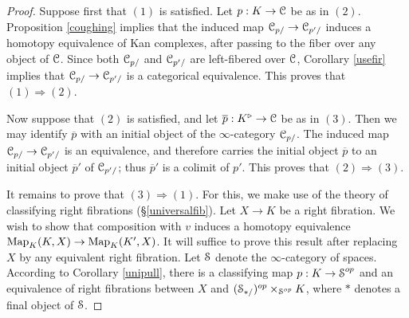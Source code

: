 \begin{proof}
Suppose first that $(1)$ is satisfied. Let $p: K \rightarrow \operatorname{\mathcal{C}}$ be as in $(2)$. Proposition \ref{coughing} implies that the induced map $\operatorname{\mathcal{C}}_{p/} \rightarrow \operatorname{\mathcal{C}}_{p'/}$ induces a homotopy equivalence of Kan complexes, after passing to the fiber over any object of $\operatorname{\mathcal{C}}$. Since
both $\operatorname{\mathcal{C}}_{p/}$ and $\operatorname{\mathcal{C}}_{p'/}$ are left-fibered over $\operatorname{\mathcal{C}}$, Corollary \ref{usefir} implies that
$\operatorname{\mathcal{C}}_{p/} \rightarrow \operatorname{\mathcal{C}}_{p'/}$ is a categorical equivalence. This proves that $(1) \Rightarrow (2)$.

Now suppose that $(2)$ is satisfied, and let $\overline{p}: K^{\triangleright} \rightarrow \operatorname{\mathcal{C}}$
be as in $(3)$. Then we may identify $\overline{p}$ with an initial object of the $\infty$-category
$\operatorname{\mathcal{C}}_{p/}$. The induced map $\operatorname{\mathcal{C}}_{p/} \rightarrow \operatorname{\mathcal{C}}_{p'/}$ is an equivalence, and therefore carries the initial object $\overline{p}$ to an initial object $\overline{p}'$ of $\operatorname{\mathcal{C}}_{p'/}$; thus
$\overline{p}'$ is a colimit of $p'$. This proves that $(2) \Rightarrow (3)$.

It remains to prove that $(3) \Rightarrow (1)$. For this, we make use of the theory of 
classifying right fibrations (\S \ref{universalfib}). Let $X \rightarrow K$ be a right fibration. We wish to show that composition with $v$ induces a homotopy equivalence $\operatorname{{Map}}_{K}(K,X) \rightarrow \operatorname{{Map}}_{K}(K',X)$. It will suffice to prove this result after replacing $X$ by any equivalent right fibration. Let $\operatorname{\mathcal{S}}$ denote the $\infty$-category of spaces. According to Corollary \ref{unipull}, there is a classifying map $p: K \rightarrow \operatorname{\mathcal{S}}^{op}$ and an equivalence of right fibrations between $X$ and $(\operatorname{\mathcal{S}}_{\ast/})^{op} \times_{\operatorname{\mathcal{S}}^{op}} K$, where $\ast$ denotes a final object
of $\operatorname{\mathcal{S}}$.


\end{proof}
